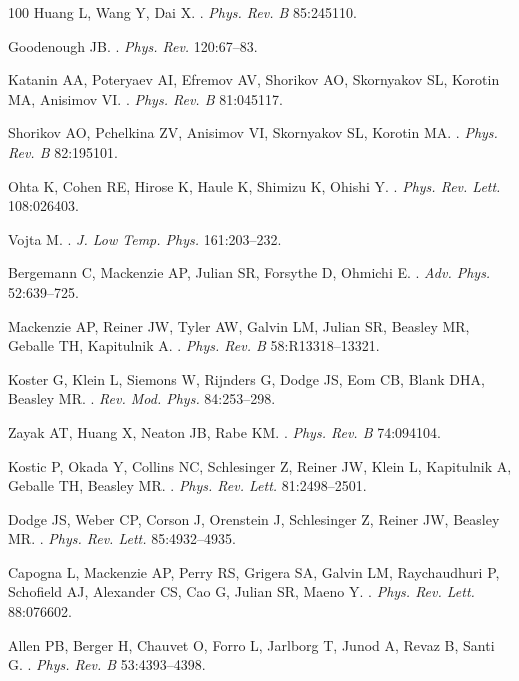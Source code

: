 \documentclass[]{ar2e-changed}%
\begin{document}
\begin{thebibliography}{100}
Huang L, Wang Y, Dai X.
.
\newblock \emph{Phys. Rev. B} 85:245110.

Goodenough JB.
.
\newblock \emph{Phys. Rev.} 120:67--83.

Katanin AA, Poteryaev AI, Efremov AV, Shorikov AO, Skornyakov SL, Korotin MA,
  Anisimov VI.
.
\newblock \emph{Phys. Rev. B} 81:045117.

Shorikov AO, Pchelkina ZV, Anisimov VI, Skornyakov SL, Korotin MA.
.
\newblock \emph{Phys. Rev. B} 82:195101.

Ohta K, Cohen RE, Hirose K, Haule K, Shimizu K, Ohishi Y.
.
\newblock \emph{Phys. Rev. Lett.} 108:026403.

Vojta M.
.
\newblock \emph{J. Low Temp. Phys.} 161:203--232.

Bergemann C, Mackenzie AP, Julian SR, Forsythe D, Ohmichi E.
.
\newblock \emph{Adv. Phys.} 52:639--725.

Mackenzie AP, Reiner JW, Tyler AW, Galvin LM, Julian SR, Beasley MR, Geballe
  TH, Kapitulnik A.
.
\newblock \emph{Phys. Rev. B} 58:R13318--13321.

Koster G, Klein L, Siemons W, Rijnders G, Dodge JS, Eom CB, Blank DHA, Beasley
  MR.
.
\newblock \emph{Rev. Mod. Phys.} 84:253--298.

Zayak AT, Huang X, Neaton JB, Rabe KM.
.
\newblock \emph{Phys. Rev. B} 74:094104.

Kostic P, Okada Y, Collins NC, Schlesinger Z, Reiner JW, Klein L, Kapitulnik A,
  Geballe TH, Beasley MR.
.
\newblock \emph{Phys. Rev. Lett.} 81:2498--2501.

Dodge JS, Weber CP, Corson J, Orenstein J, Schlesinger Z, Reiner JW, Beasley
  MR.
.
\newblock \emph{Phys. Rev. Lett.} 85:4932--4935.

Capogna L, Mackenzie AP, Perry RS, Grigera SA, Galvin LM, Raychaudhuri P,
  Schofield AJ, Alexander CS, Cao G, Julian SR, Maeno Y.
.
\newblock \emph{Phys. Rev. Lett.} 88:076602.

Allen PB, Berger H, Chauvet O, Forro L, Jarlborg T, Junod A, Revaz B, Santi G.
.
\newblock \emph{Phys. Rev. B} 53:4393--4398.


\end{thebibliography}
\end{document}
